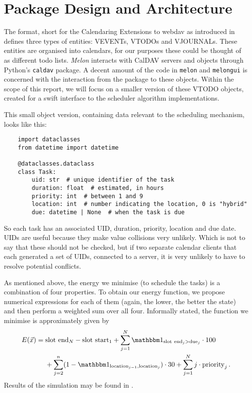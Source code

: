 \section{Package Design and Architecture}
The  format, short for the Calendaring Extensions to \gls{webdav} as introduced in \cite{caldav-rfc} defines three types of entities: VEVENTs, VTODOs and VJOURNALs.
These entities are organised into calendars, for our purposes these could be thought of as different todo lists.
\textit{Melon} interacts with CalDAV servers and objects through Python's \texttt{caldav} package.
A decent amount of the code in \texttt{melon} and \texttt{melongui} is concerned with the interaction from the package to these objects.
Within the scope of this report, we will focus on a smaller version of these VTODO objects, created for a swift interface to the scheduler algorithm implementations.

This small object version, containing data relevant to the scheduling mechanism, looks like this:
\begin{verbatim}
    import dataclasses
    from datetime import datetime

    @dataclasses.dataclass
    class Task:
        uid: str  # unique identifier of the task
        duration: float  # estimated, in hours
        priority: int  # between 1 and 9
        location: int  # number indicating the location, 0 is "hybrid"
        due: datetime | None  # when the task is due
  \end{verbatim}

So each task has an associated UID, duration, priority, location and due date.
UIDs are useful because they make value collisions very unlikely.
Which is not to say that these should not be checked, but if two separate calendar clients that each generated a set of UIDs, connected to a server, it is very unlikely to have to resolve potential conflicts.

As mentioned above, the energy we minimise (to schedule the tasks) is a combination of four properties.
To obtain our energy function, we propose numerical expressions for each of them (again, the lower, the better the state) and then perform a weighted sum over all four.
Informally stated, the function we minimise is approximately given by
\begin{align}
  \label{eq:energy} E(\vec{x}) = \; & \mathrm{slot~end}_N - \mathrm{slot~start}_1 + \sum_{j=1}^{N} \identity_{\mathrm{slot~end}_j > \mathrm{due}_j} \cdot 100                    \\
  \nonumber                         & + \sum_{j=2}^{n} (1 - \identity_{\mathrm{location}_{j-1}, \mathrm{location}_{j}}) \cdot 30 + \sum_{j=1}^{N} j \cdot \mathrm{priority}_j\,.
\end{align}
Results of the simulation may be found in .

